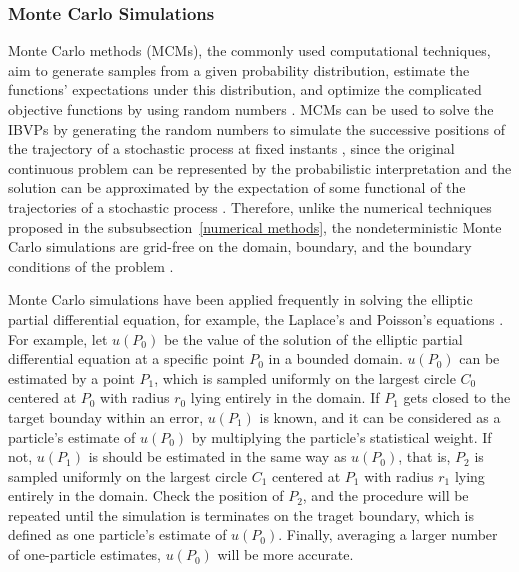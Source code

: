 \subsubsection{Monte Carlo Simulations}

Monte Carlo methods (MCMs), the commonly used computational techniques, aim to generate samples from a given probability distribution, estimate the functions' expectations under this distribution, and optimize the complicated objective functions by using random numbers \cite{kroese2014monte}. MCMs can be used to solve the IBVPs by generating the random numbers to simulate the successive positions of the trajectory of a stochastic process at fixed instants \cite{kronberg1976solution}\cite{king1951monte}, since the original continuous problem can be represented by the probabilistic interpretation and the solution can be approximated by the expectation of some functional of the trajectories of a stochastic process \cite{grebenkov2014efficient}\cite{sabelfeld2013random}. Therefore, unlike the numerical techniques proposed in the subsubsection~\ref{numerical methods}, the nondeterministic Monte Carlo simulations are grid-free on the domain, boundary, and the boundary conditions of the problem \cite{grebenkov2014efficient}.


Monte Carlo simulations have been applied frequently in solving the elliptic partial differential equation, for example, the Laplace’s and Poisson’s equations \cite{haji1967application} \cite{booth1981exact} \cite{muller1956some}. For example, let $u(P_0)$ be the value of the solution of the elliptic partial differential equation at a specific point $P_0$ in a bounded domain. $u(P_0)$ can be estimated by a point $P_1$, which is sampled uniformly on the largest circle $C_0$ centered at $P_0$ with radius $r_0$ lying entirely in the domain. If $P_1$ gets closed to the target bounday within an error, $u(P_1)$ is known, and it can be considered as a particle's estimate of $u(P_0)$ by multiplying the particle’s statistical weight. If not, $u(P_1)$ is should be estimated in the same way as $u(P_0)$, that is, $P_2$ is sampled uniformly on the largest circle $C_1$ centered at $P_1$ with radius $r_1$ lying entirely in the domain. Check the position of $P_2$, and the procedure will be repeated until the simulation is terminates on the traget boundary, which is defined as one particle's estimate of $u(P_0)$. Finally, averaging a larger number of one-particle estimates, $u(P_0)$ will be more accurate. 


